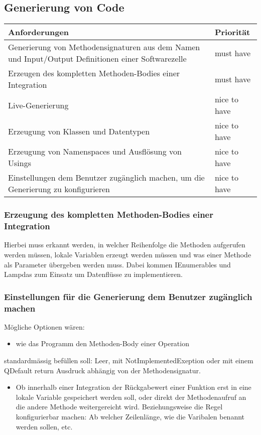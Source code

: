 \documentclass[11pt]{article}
\begin{document}
\subsection{Generierung von Code}
\label{sec:orgheadline11}
\begin{center}
\begin{tabular}{ll}
Anforderungen & Priorität\\
\hline
Generierung von Methodensignaturen aus dem Namen und Input/Output Definitionen einer Softwarezelle & must have\\
Erzeugen des kompletten Methoden-Bodies einer Integration & must have\\
Live-Generierung & nice to have\\
Erzeugung von Klassen und Datentypen & nice to have\\
Erzeugung von Namenspaces und Ausflösung von Usings & nice to have\\
Einstellungen  dem Benutzer zugänglich machen, um die Generierung zu konfigurieren & nice to have\\
\end{tabular}
\end{center}

\subsubsection{Erzeugung des kompletten Methoden-Bodies einer Integration}
\label{sec:orgheadline9}
Hierbei muss erkannt werden, in welcher Reihenfolge die Methoden aufgerufen
werden müssen, lokale Variablen erzeugt werden müssen und was einer Methode als Parameter
übergeben werden muss. Dabei kommen IEnumerables und Lampdas zum Einsatz um
Datenflüsse zu implementieren. 

\subsubsection{Einstellungen für die Generierung dem Benutzer zugänglich machen}
\label{sec:orgheadline10}
Mögliche Optionen wären:
\begin{itemize}
\item wie das Programm den Methoden-Body einer Operation
\end{itemize}
standardmässig befüllen soll: Leer, mit NotImplementedExeption oder mit einem
QDefault return Ausdruck abhängig von der Methodensignatur. 
\begin{itemize}
\item Ob innerhalb einer Integration der Rückgabewert einer Funktion erst in eine
lokale Variable gespeichert werden soll, oder direkt der Methodenaufruf an die
andere Methode weitergereicht wird. Beziehungsweise die Regel konfigurierbar
machen: Ab welcher Zeilenlänge, wie die Varibalen benannt werden sollen, etc.
\end{itemize}
\end{document}
